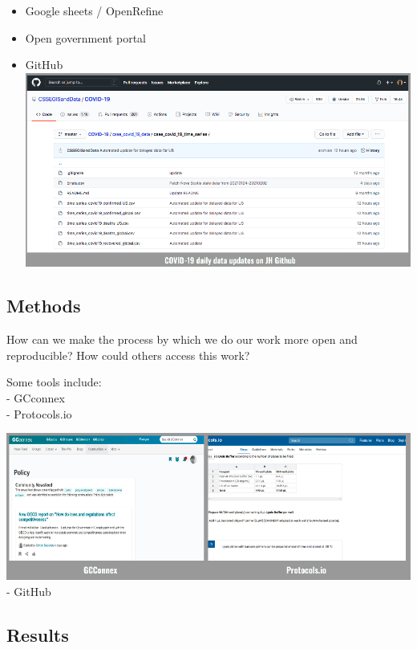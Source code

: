 \documentclass[
  12pt,
]{book}
\providecommand{\tightlist}{%
  \setlength{\itemsep}{0pt}\setlength{\parskip}{0pt}}
\begin{document}
\begin{itemize}
\tightlist
\item
  Google sheets / OpenRefine\\
\item
  Open government portal\\
\item
  GitHub\\
  \includegraphics{rr-presentation-figure/Covid.png}
\end{itemize}

\hypertarget{methods}{%
\subsection{Methods}\label{methods}}

How can we make the process by which we do our work more open and reproducible? How could others access this work?

Some tools include:\\
- GCconnex\\
- Protocols.io

\includegraphics{rr-presentation-figure/methods.png}
- GitHub

\hypertarget{results}{%
\subsection{Results}\label{results}}
\end{document}
